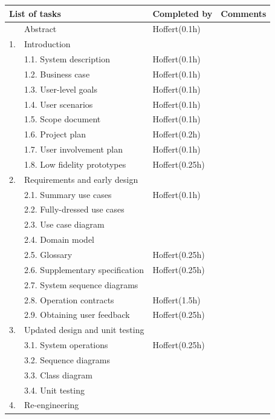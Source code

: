 \documentclass[12pt,a4paper]{article}
\begin{document}
\begin{longtable}{| p{0.2cm} p{6.25cm} | p{3cm}| p{5cm} |}
  \hline
  \multicolumn{2}{|l|}{\textbf{List of tasks}} & \textbf{Completed by} & \textbf{Comments} \\ \hline
   & Abstract & Hoffert(0.1h) &  \\ \hline
  1. & Introduction &  &  \\ \hline
   & 1.1. System description & Hoffert(0.1h) &  \\ \hline
   & 1.2. Business case & Hoffert(0.1h) &  \\ \hline
   & 1.3. User-level goals & Hoffert(0.1h) &  \\ \hline
   & 1.4. User scenarios & Hoffert(0.1h) &  \\ \hline
   & 1.5. Scope document & Hoffert(0.1h) &  \\ \hline
   & 1.6. Project plan & Hoffert(0.2h) &  \\ \hline
   & 1.7. User involvement plan & Hoffert(0.1h) &  \\ \hline
   & 1.8. Low fidelity prototypes & Hoffert(0.25h) &  \\ \hline
  2. & Requirements and early design &  &  \\ \hline
   & 2.1. Summary use cases & Hoffert(0.1h) &  \\ \hline
   & 2.2. Fully-dressed use cases &  &  \\ \hline
   & 2.3. Use case diagram &  &  \\ \hline
   & 2.4. Domain model &  &  \\ \hline
   & 2.5. Glossary & Hoffert(0.25h) &  \\ \hline
   & 2.6. Supplementary specification & Hoffert(0.25h) &  \\ \hline
   & 2.7. System sequence diagrams &  &  \\ \hline
   & 2.8. Operation contracts & Hoffert(1.5h) &  \\ \hline
   & 2.9. Obtaining user feedback & Hoffert(0.25h) &  \\ \hline
  3. & Updated design and unit testing &  &  \\ \hline
   & 3.1. System operations & Hoffert(0.25h) &  \\ \hline
   & 3.2. Sequence diagrams &  &  \\ \hline
   & 3.3. Class diagram &  &  \\ \hline
   & 3.4. Unit testing &  &  \\ \hline
  4. & Re-engineering &  &  \\ \hline

\end{longtable}
\end{document}
